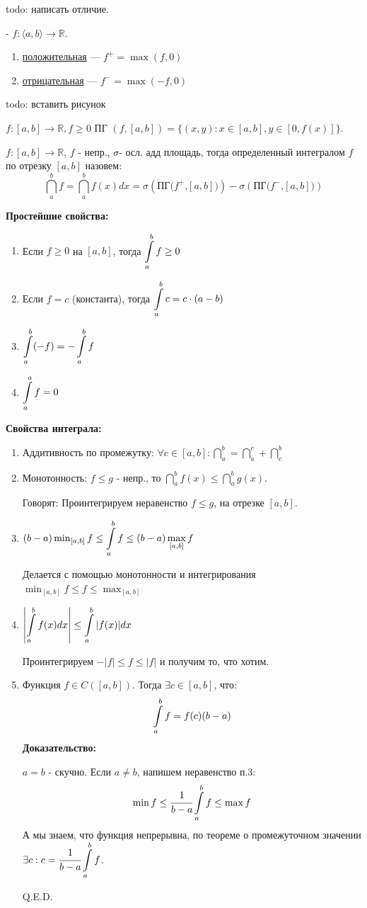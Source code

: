 todo: написать отличие.

  - $f:\langle a,b\rangle \rightarrow \mathbb{R} $.
\begin{enumerate}
    \item \uline{положительная} --- $f^+ = \max(f,0)$
    \item \uline{отрицательная} --- $f^- = \max(-f,0)$
\end{enumerate}

todo: вставить рисунок

 $f:[a,b] \rightarrow \mathbb{R}, f\geq 0$ ПГ $(f,[a,b]) = \{(x,y): x\in [a,b], y \in [0,f(x)]\}$.

 $f: [a,b] \rightarrow \mathbb{R}$, $f$ - непр., $\sigma $- осл. адд площадь, тогда определенный интегралом $f$ по отрезку $[a,b]$ назовем: $$\dint\limits_{a}^b f =\dint\limits_{a}^b f(x) dx =\sigma(\text{ПГ($f^+$,$[a,b]$)})-\sigma(\text{ПГ($f^-$,$[a,b]$)})$$

\textbf{Простейшие свойства:}
\begin{enumerate}
    \item Если $f \ge 0$ на $[a, b]$, тогда $\displaystyle\int\limits_{a}^{b}f \ge 0$
    \item Если $f = c$ (константа), тогда $\displaystyle\int\limits_{a}^{b}c = c \cdot (a - b)$
    \item $\displaystyle\int\limits_{a}^{b}(-f) = -\displaystyle\int\limits_{a}^{b}f$
    \item $\displaystyle\int\limits_{a}^{a}f = 0$
\end{enumerate}

\textbf{Свойства интеграла:}
\begin{enumerate}
    \item Аддитивность по промежутку: $\forall c \in [a,b]:\dint\limits_{a}^b =\dint\limits_{a}^c + \dint\limits_{c}^b $
    \item Монотонность: $f\leq g$ - непр., то $\dint\limits_{a}^b f(x)\leq \dint\limits_{a}^b g(x)$. 

    Говорят: Проинтегрируем неравенство $f\leq g$, на отрезке $[a,b]$.

    \item $(b-a)\min_{[a,b]} f \leq\displaystyle\int\limits_{a}^{b}f\leq (b-a)\max_{[a,b]}f$

    Делается с помощью монотонности и интегрирования $\min_{[a,b]}f\leq f\leq\max_{[a,b]}$

    \item $\left|\displaystyle\int\limits_{a}^{b}f(x)dx\right|\leq \displaystyle\int\limits_{a}^{b}|f(x)|dx$

    Проинтегрируем $-|f|\leq f\leq |f|$ и получим то, что хотим.

    \item {}

    Функция $f \in C([a,b])$. Тогда $\exists c \in [a,b]$, что:
    $$\displaystyle\int\limits_{a}^{b}f = f(c)(b-a)$$
    \textbf{Доказательство:} 
    
    $a=b$ - скучно. Если $a\neq b$, напишем неравенство п.3:
    $$\min f\leq \cfrac{1}{b-a}\displaystyle\int\limits_{a}^{b}f\leq \max f$$ А мы знаем, что функция непрерывна, по теореме о промежуточном значении $\exists c: c = \cfrac{1}{b-a}\displaystyle\int\limits_{a}^{b}f$. 
    
    \hfill Q.E.D.
\end{enumerate}

